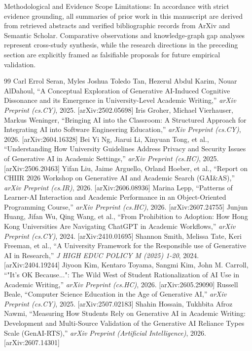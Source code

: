 \documentclass[10pt,twocolumn,letterpaper]{article}
\begin{document}
Methodological and Evidence Scope Limitations: In accordance with strict evidence grounding, all summaries of prior work in this manuscript are derived from retrieved abstracts and verified bibliographic records from ArXiv and Semantic Scholar. Comparative observations and knowledge-graph gap analyses represent cross-study synthesis, while the research directions in the preceding section are explicitly framed as falsifiable proposals for future empirical validation.

\begin{thebibliography}{99}
 Carl Errol Seran, Myles Joshua Toledo Tan, Hezerul Abdul Karim, Nouar AlDahoul, ``A Conceptual Exploration of Generative AI-Induced Cognitive Dissonance and its Emergence in University-Level Academic Writing,'' \textit{arXiv Preprint (cs.CY)}, 2025. [arXiv:2502.05698]
 Iris Groher, Michael Vierhauser, Markus Weninger, ``Bringing AI into the Classroom: A Structured Approach for Integrating AI into Software Engineering Education,'' \textit{arXiv Preprint (cs.CY)}, 2026. [arXiv:2604.16328]
 Bei Yi Ng, Jiarui Li, Xinyuan Tong, et al., ``Understanding How University Guidelines Address Privacy and Security Issues of Generative AI in Academic Settings,'' \textit{arXiv Preprint (cs.HC)}, 2025. [arXiv:2506.20463]
 Yifan Liu, Jaime Arguello, Orland Hoeber, et al., ``Report on CHIIR 2026 Workshop on Generative AI and Academic Search (GAI\&AS),'' \textit{arXiv Preprint (cs.IR)}, 2026. [arXiv:2606.08936]
 Marina Lepp, ``Patterns of Learner-AI Interaction and Academic Performance in an Object-Oriented Programming Course,'' \textit{arXiv Preprint (cs.HC)}, 2026. [arXiv:2607.24755]
 Junjun Huang, Jifan Wu, Qing Wang, et al., ``From Prohibition to Adoption: How Hong Kong Universities Are Navigating ChatGPT in Academic Workflows,'' \textit{arXiv Preprint (cs.CY)}, 2024. [arXiv:2410.01695]
 Shannon Smith, Melissa Tate, Keri Freeman, et al., ``A University Framework for the Responsible use of Generative AI in Research,'' \textit{J HIGH EDUC POLICY M (2025) 1-20}, 2024. [arXiv:2404.19244]
 Jiyoon Kim, Kentaro Toyama, Sangmi Kim, John M. Carroll, ``"It's OK Because...": The Wild West of Student Rationalization of AI Use in Academic Writing,'' \textit{arXiv Preprint (cs.HC)}, 2026. [arXiv:2605.29090]
 Russell Beale, ``Computer Science Education in the Age of Generative AI,'' \textit{arXiv Preprint (cs.CY)}, 2025. [arXiv:2507.02183]
 Shahin Hossain, Tukhbita Afroz Nawmi, ``Measuring How Students Rely on Generative AI in Academic Writing: Development and Multi-Source Validation of the Generative AI Reliance Types Scale (GenAI-RTS),'' \textit{arXiv Preprint (Artificial Intelligence)}, 2026. [arXiv:2607.14301]

\end{thebibliography}
\end{document}
